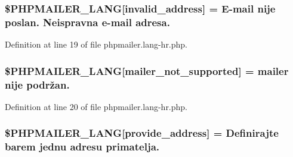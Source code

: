 \subsubsection[{\texorpdfstring{\$\+P\+H\+P\+M\+A\+I\+L\+E\+R\+\_\+\+L\+A\+NG}{$PHPMAILER_LANG}}]{\setlength{\rightskip}{0pt plus 5cm}\$P\+H\+P\+M\+A\+I\+L\+E\+R\+\_\+\+L\+A\+NG\mbox{[}\textquotesingle{}invalid\+\_\+address\textquotesingle{}\mbox{]} = \textquotesingle{}E-\/mail nije poslan. Neispravna {\bf e}-\/mail adresa.\textquotesingle{}}\hypertarget{phpmailer_8lang-hr_8php_a42d61bcea4c79599ecb44fd062f54d47}{}\label{phpmailer_8lang-hr_8php_a42d61bcea4c79599ecb44fd062f54d47}


Definition at line 19 of file phpmailer.\+lang-\/hr.\+php.

\subsubsection[{\texorpdfstring{\$\+P\+H\+P\+M\+A\+I\+L\+E\+R\+\_\+\+L\+A\+NG}{$PHPMAILER_LANG}}]{\setlength{\rightskip}{0pt plus 5cm}\$P\+H\+P\+M\+A\+I\+L\+E\+R\+\_\+\+L\+A\+NG\mbox{[}\textquotesingle{}mailer\+\_\+not\+\_\+supported\textquotesingle{}\mbox{]} = \textquotesingle{} mailer nije podržan.\textquotesingle{}}\hypertarget{phpmailer_8lang-hr_8php_aa2ebcb8833ee83a7ad67401c4bb3a6ad}{}\label{phpmailer_8lang-hr_8php_aa2ebcb8833ee83a7ad67401c4bb3a6ad}


Definition at line 20 of file phpmailer.\+lang-\/hr.\+php.

\subsubsection[{\texorpdfstring{\$\+P\+H\+P\+M\+A\+I\+L\+E\+R\+\_\+\+L\+A\+NG}{$PHPMAILER_LANG}}]{\setlength{\rightskip}{0pt plus 5cm}\$P\+H\+P\+M\+A\+I\+L\+E\+R\+\_\+\+L\+A\+NG\mbox{[}\textquotesingle{}provide\+\_\+address\textquotesingle{}\mbox{]} = \textquotesingle{}Definirajte barem jednu adresu primatelja.\textquotesingle{}}\hypertarget{phpmailer_8lang-hr_8php_a8b97897c2406b7392b056f375feeefbb}{}\label{phpmailer_8lang-hr_8php_a8b97897c2406b7392b056f375feeefbb}


